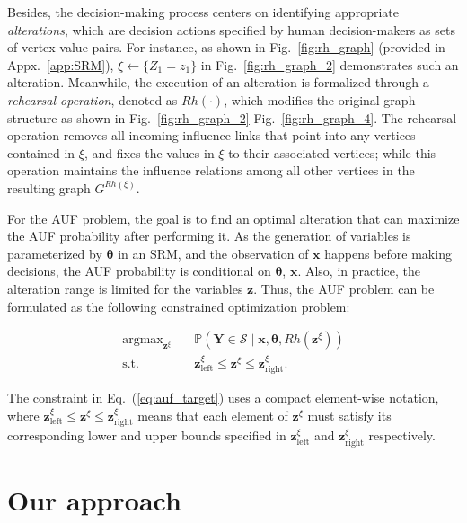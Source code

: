 \documentclass{article}
\theoremstyle{plain}
\theoremstyle{definition}
\def \x {\mathbf{x}}
\def \Y{\mathbf{Y}}
\def \Fig {Fig.}
\def \Eq {Eq.}
\def \x {\mathbf{x}}
\def \sS {\mathcal{S}}
\def \Y {\mathbf{Y}}
\def \z {\mathbf{z}}
\begin{document}
Besides, the decision-making process centers on identifying appropriate \textit{alterations}, which are decision actions specified by human decision-makers as sets of vertex-value pairs. For instance, as shown in Fig.~\ref{fig:rh_graph} (provided in Appx.~\ref{app:SRM}), $\xi\leftarrow\{Z_1=z_1\}$ in \Fig~\ref{fig:rh_graph_2} demonstrates such an alteration. 
Meanwhile, the execution of an alteration is formalized through a \textit{rehearsal operation}, denoted as $Rh(\cdot)$, which modifies the original graph structure as shown in \Fig~\ref{fig:rh_graph_2}-\Fig~\ref{fig:rh_graph_4}. 
The rehearsal operation removes all incoming influence links that point into any vertices contained in $\xi$, and fixes the values in $\xi$ to their associated vertices; while this operation maintains the influence relations among all other vertices in the resulting graph $G^{Rh(\xi)}$.

For the AUF problem, the goal is to find an optimal alteration that can maximize the AUF probability after performing it. As the generation of variables is parameterized by $\bm{\theta}$ in an SRM, and the observation of $\x$ happens before making decisions, the AUF probability is conditional on $\bm{\theta}$, $\x$. Also, in practice, the alteration range is limited for the variables $\z$. Thus, the AUF problem can be formulated as the following constrained optimization problem:

\vspace*{-0.1in}
\begin{equation}
  \label{eq:auf_target}
  \begin{aligned}
    \mathop{\arg\max}_{\z^\xi}\quad & \mathbb{P}\left(\Y\in\sS \mid \x, \bm{\theta}, Rh(\z^\xi)\right)\\[-0.1in]
    \operatorname*{s.t.}\quad & \z^\xi_{\operatorname*{left}}\leq \z^\xi\leq \z^\xi_{\operatorname*{right}}.
  \end{aligned}
\end{equation}

 The constraint in \Eq~(\ref{eq:auf_target}) uses a compact element-wise notation, where \(\z^\xi_{\operatorname*{left}}\leq \z^\xi\leq \z^\xi_{\operatorname*{right}}\) means that each element of \(\z^\xi\) must satisfy its corresponding lower and upper bounds specified in \(\z^\xi_{\operatorname*{left}}\) and \(\z^\xi_{\operatorname*{right}}\) respectively.




\section{Our approach}
\end{document}
